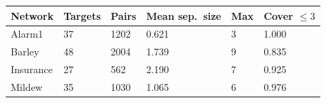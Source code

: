 \begin{tabular}{llllll}
\toprule
Network & Targets & Pairs & Mean sep.\ size & Max & Cover $\leq 3$ \\
\midrule
Alarm1 & 37 & 1202 & 0.621 & 3 & 1.000 \\
Barley & 48 & 2004 & 1.739 & 9 & 0.835 \\
Insurance & 27 & 562 & 2.190 & 7 & 0.925 \\
Mildew & 35 & 1030 & 1.065 & 6 & 0.976 \\
\bottomrule
\end{tabular}
